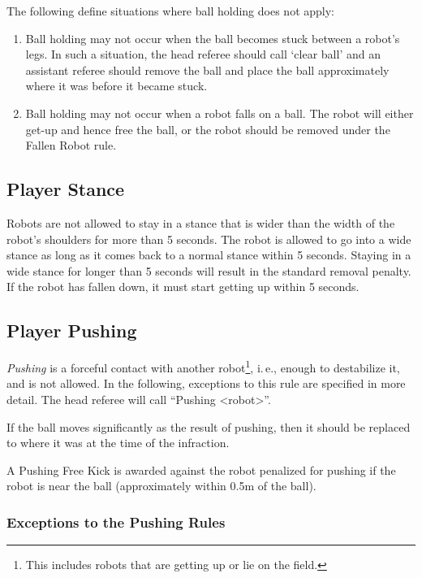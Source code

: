 \documentclass[12pt]{article}
\newcommand{\ie}{\mbox{i.\,e.}\xspace}
\begin{document}
The following define situations where ball holding does not apply:

\begin{enumerate}
\item Ball holding may not occur when the ball becomes stuck between a robot's legs.  In such a situation, the head referee should call `clear ball' and an assistant referee should remove the ball and place the ball approximately where it was before it became stuck.
\item Ball holding may not occur when a robot falls on a ball.  The robot will either get-up and hence free the ball, or the robot should be removed under the Fallen Robot rule.
\end{enumerate}

\subsection{Player Stance}
\label{sec:player_stance}

Robots are not allowed to stay in a stance that is wider than the width of the robot's shoulders for more than 5 seconds. The robot is allowed to go into a wide stance as long as it comes back to a normal stance within 5 seconds. Staying in a wide stance for longer than 5 seconds will result in the standard removal penalty. If the robot has fallen down, it must start getting up within 5 seconds.

\subsection{Player Pushing}
\label{sec:player_pushing}

\emph{Pushing} is a forceful contact with another robot\footnote{This includes robots that are getting up or lie on the field.}, \ie, enough to destabilize it, and is not allowed. In the following, exceptions to this rule are specified in more detail.
The head referee will call ``Pushing \textless robot\textgreater''.

If the ball moves significantly as the result of pushing, then it should be replaced to where it was at the time of the infraction.

A Pushing Free Kick is awarded against the robot penalized for pushing if the robot is near the ball (approximately within 0.5m of the ball).

\subsubsection{Exceptions to the Pushing Rules}
\label{sec:situations_no_pushing}
\end{document}
